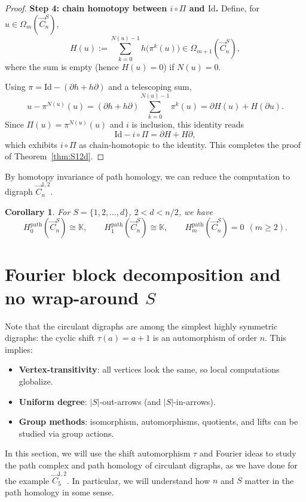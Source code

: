 \documentclass[11pt]{amsart}
\newcommand{\K}{\mathbb K}
\theoremstyle{plain}
\newtheorem{corollary}[theorem]{Corollary}
\theoremstyle{definition}
\numberwithin{equation}{section}
\begin{document}
\begin{proof}
\medskip
\noindent\textbf{Step 4: chain homotopy between $i\circ\Pi$ and $\mathrm{Id}$.}
Define, for $u\in\Omega_m(\vec{C}_n^S)$,
\[
H(u):=\sum_{k=0}^{N(u)-1} h\bigl(\pi^k(u)\bigr)\in \Omega_{m+1}(\vec{C}_n^S),
\]
where the sum is empty (hence $H(u)=0$) if $N(u)=0$.

Using $\pi=\mathrm{Id}-(\partial h+h\partial)$ and a telescoping sum,
\[
u-\pi^{N(u)}(u)=(\partial h+h\partial)\sum_{k=0}^{N(u)-1}\pi^k(u)=\partial H(u)+H(\partial u).
\]
Since $\Pi(u)=\pi^{N(u)}(u)$ and $i$ is inclusion, this identity reads
\[
\mathrm{Id}-i\circ \Pi=\partial H+H\partial,
\]
which exhibits $i\circ\Pi$ as chain-homotopic to the identity.  This completes the proof of Theorem~\ref{thm:S12d}.
\end{proof}


By homotopy invariance of path homology, we can reduce the  computation to digraph $\vec{C}_n^{1,2}$.
\begin{corollary} For $S=\{1,2,\ldots,d\}$, $2<d<n/2$, we have
\[H_0^{\mathrm{path}}(\vec{C}_n^{S})\cong \K,\qquad H_1^{\mathrm{path}}(\vec{C}_n^{S})\cong \K,\qquad H_m^{\mathrm{path}}(\vec{C}_n^{S})=0\ \ (m\ge 2).\]    
\end{corollary}


\bigskip

\section{Fourier block decomposition and no wrap-around \texorpdfstring{$S$}{S}}
\label{sec:Fourier}

Note that the circulant digraphs are among the simplest highly symmetric digraphs: the cyclic shift $\tau(a)=a+1$ is an automorphism of order $n$. This implies:
\begin{itemize}
\item \textbf{Vertex-transitivity}: all vertices look the same, so local computations globalize.
\item \textbf{Uniform degree}: $|S|$-out-arrows (and $|S|$-in-arrows).
\item \textbf{Group methods}: isomorphism, automorphisms, quotients, and lifts can be studied via group actions.
\end{itemize}

In this section, we will use the shift automorphism $\tau$ and Fourier ideas to study the path complex and path homology of circulant digraphs, as we have done for the example $\vec{C}_5^{1,2}$.
In particular, we will understand how $n$ and $S$ matter in the path homology in some sense.
\end{document}
